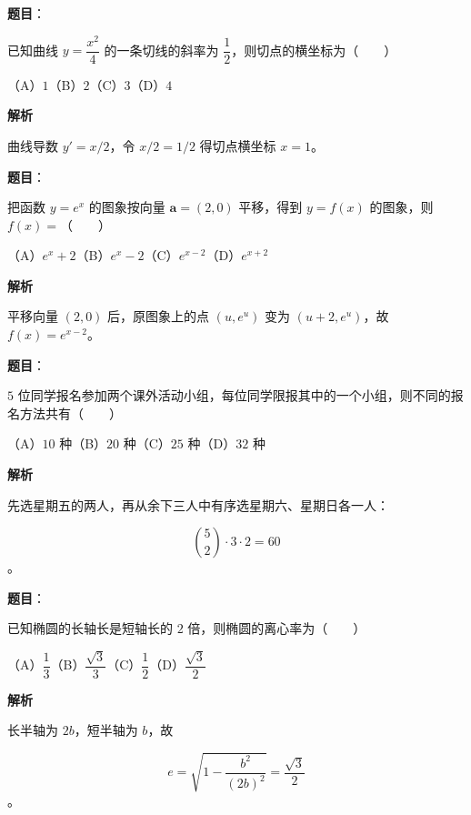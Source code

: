 \begin{answer}

\textbf{题目}：

已知曲线 $y=\dfrac{x^2}{4}$ 的一条切线的斜率为 $\dfrac12$，则切点的横坐标为\mbox{（　　）}

（A）$1$\quad（B）$2$\quad（C）$3$\quad（D）$4$

\textbf{解析}

曲线导数 $y'=x/2$，令 $x/2=1/2$ 得切点横坐标 $x=1$。


\end{answer}
\begin{answer}

\textbf{题目}：

把函数 $y=e^x$ 的图象按向量 $\boldsymbol a=(2,0)$ 平移，得到 $y=f(x)$ 的图象，则 $f(x)=$\mbox{（　　）}

（A）$e^x+2$\quad（B）$e^x-2$\quad（C）$e^{x-2}$\quad（D）$e^{x+2}$

\textbf{解析}

平移向量 $(2,0)$ 后，原图象上的点 $(u,e^u)$ 变为 $(u+2,e^u)$，故 $f(x)=e^{x-2}$。


\end{answer}
\begin{answer}

\textbf{题目}：

$5$ 位同学报名参加两个课外活动小组，每位同学限报其中的一个小组，则不同的报名方法共有\mbox{（　　）}

（A）$10$ 种\quad（B）$20$ 种\quad（C）$25$ 种\quad（D）$32$ 种

\textbf{解析}

先选星期五的两人，再从余下三人中有序选星期六、星期日各一人：

\nopagebreak[4]
\[
\binom52\cdot3\cdot2=60
\]
。


\end{answer}
\begin{answer}

\textbf{题目}：

已知椭圆的长轴长是短轴长的 $2$ 倍，则椭圆的离心率为\mbox{（　　）}

（A）$\dfrac13$\quad（B）$\dfrac{\sqrt3}{3}$\quad（C）$\dfrac12$\quad（D）$\dfrac{\sqrt3}{2}$

\textbf{解析}

长半轴为 $2b$，短半轴为 $b$，故

\nopagebreak[4]
\[
e=\sqrt{1-\frac{b^2}{(2b)^2}}=\frac{\sqrt3}{2}
\]
。


\end{answer}
